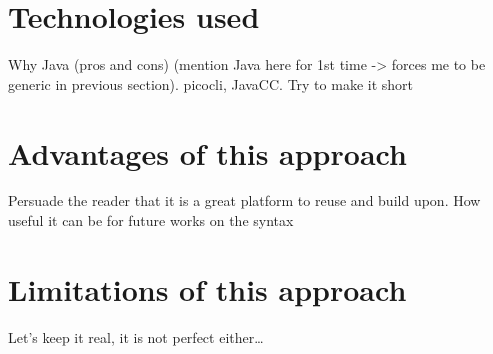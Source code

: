 \section{Technologies used}\label{sec:ch2TechStack}
Why Java (pros and cons) (mention Java here for 1st time -> forces me to be generic in previous section). picocli, JavaCC.\newline
Try to make it short

\section{Advantages of this approach}\label{sec:ch2CompilerPros}
Persuade the reader that it is a great platform to reuse and build upon.
How useful it can be for future works on the syntax

\section{Limitations of this approach}\label{sec:ch2CompilerCons}
Let's keep it real, it is not perfect either\ldots